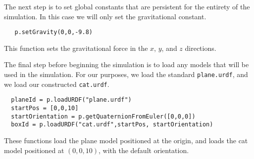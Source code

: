 \documentclass[12]{amsart}
\theoremstyle{definition}
\begin{document}
The next step is to set global constants that are persistent for the entirety
of the simulation. In this case we will only set the gravitational constant.
\begin{verbatim}
   p.setGravity(0,0,-9.8)
\end{verbatim}
This function sets the gravitational force in the $x$, $y$, and $z$ directions.

The final step before beginning the simulation is to load any models that will
be used in the simulation. For our purposes, we load the standard
\texttt{plane.urdf}, and we load our constructed \texttt{cat.urdf}.
\begin{verbatim}
  planeId = p.loadURDF("plane.urdf")
  startPos = [0,0,10]
  startOrientation = p.getQuaternionFromEuler([0,0,0])
  boxId = p.loadURDF("cat.urdf",startPos, startOrientation)
\end{verbatim}
These functions load the plane model positioned at the origin, and loads the
cat model positioned at $(0,0,10)$, with the default orientation.
\end{document}
